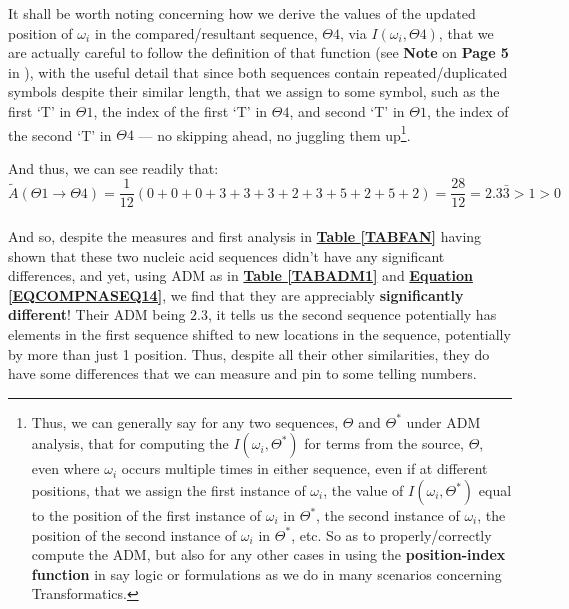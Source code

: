 \documentclass[a4paper, 18pt]{book} %
\begin{document}
It shall be worth noting concerning how we derive the values of the updated position of $\omega_i$ in the compared/resultant sequence, $\Theta4$, via $I(\omega_i,\Theta4)$, that we are actually careful to follow the definition of that function (see \textbf{Note} on \textbf{Page 5} in \cite{transformatics}), with the useful detail that since both sequences contain repeated/duplicated symbols despite their similar length, that we assign to some symbol, such as the first `T' in $\Theta1$, the index of the first `T' in $\Theta4$, and second `T' in $\Theta1$, the index of the second `T' in $\Theta4$ --- no skipping ahead, no juggling them up\footnote{Thus, we can generally say for any two sequences, $\Theta$ and $\Theta^*$ under ADM analysis, that for computing the $I(\omega_i,\Theta^*)$ for terms from the source, $\Theta$, even where $\omega_i$ occurs multiple times in either sequence, even if at different positions, that we assign the first instance of $\omega_i$, the value of $I(\omega_i,\Theta^*)$ equal to the position of the first instance of $\omega_i$ in $\Theta^*$, the second instance of $\omega_i$, the position of the second instance of $\omega_i$ in $\Theta^*$, etc. So as to properly/correctly compute the ADM, but also for any other cases in using the \textbf{position-index function} in say logic or formulations as we do in many scenarios concerning Transformatics.}.

And thus, we can see readily that:\\

\begin{equation}
\label{EQCOMPNASEQ14}
\tilde{A}(\Theta1 \rightarrow \Theta4) = \frac{1}{12}(0 + 0 + 0 + 3 + 3 + 3 + 2 + 3 + 5 + 2 + 5 + 2) = \frac{28}{12} = 2.3\bar{3} > 1 > 0
\end{equation}\\

And so, despite the measures and first analysis in \textbf{\hyperref[TABFAN]{Table \ref{TABFAN}}} having shown that these two nucleic acid sequences didn't have any significant differences, and yet, using ADM as in \textbf{\hyperref[TABADM1]{Table \ref{TABADM1}}} and \textbf{\hyperref[EQCOMPNASEQ14]{Equation \ref{EQCOMPNASEQ14}}}, we find that they are appreciably \textbf{significantly different}! Their ADM being $2.3$, it tells us the second sequence potentially has elements in the first sequence shifted to new locations in the sequence, potentially by more than just 1 position. Thus, despite all their other similarities, they do have some differences that we can measure and pin to some telling numbers.
\end{document}
